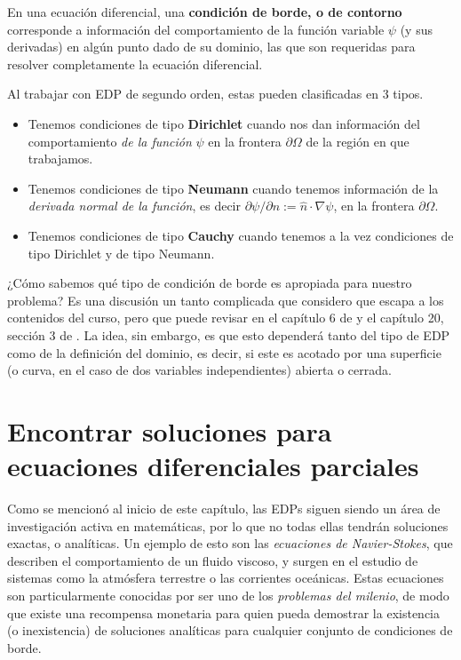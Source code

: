 \begin{defi} 
    En una ecuación diferencial, una \textbf{condición de borde, o de contorno} corresponde a información del comportamiento de la función variable $\psi$ (y sus derivadas) en algún punto dado de su dominio, las que son requeridas para resolver completamente la ecuación diferencial.

    Al trabajar con EDP de segundo orden, estas pueden clasificadas en 3 tipos.
    \begin{itemize}
        \item Tenemos condiciones de tipo \textbf{Dirichlet} cuando nos dan información del comportamiento \emph{de la función} $\psi$ en la frontera $\partial \Omega$ de la región en que trabajamos.
        \item Tenemos condiciones de tipo \textbf{Neumann} cuando tenemos información de la \emph{derivada normal de la función}, es decir $\partial \psi/\partial n := \hat{n} \cdot \nabla \psi$, en la frontera $\partial \Omega$.
        \item Tenemos condiciones de tipo \textbf{Cauchy} cuando tenemos a la vez condiciones de tipo Dirichlet y de tipo Neumann.
    \end{itemize} 
\end{defi}



¿Cómo sabemos qué tipo de condición de borde es apropiada para nuestro problema? Es una discusión un tanto complicada que considero que escapa a los contenidos del curso, pero que puede revisar en el capítulo 6 de \cite{Morse_Feshbach_1999} y el capítulo 20, sección 3 de \cite{Riley}. La idea, sin embargo, es que esto dependerá tanto del tipo de EDP como de la definición del dominio, es decir, si este es acotado por una superficie (o curva, en el caso de dos variables independientes) abierta o cerrada.

\section{Encontrar soluciones para ecuaciones diferenciales parciales}

Como se mencionó al inicio de este capítulo, las EDPs siguen siendo un área de investigación activa en matemáticas, por lo que no todas ellas tendrán soluciones exactas, o analíticas. Un ejemplo de esto son las \emph{ecuaciones de Navier-Stokes}, que describen el comportamiento de un fluido viscoso, y surgen en el estudio de sistemas como la atmósfera terrestre o las corrientes oceánicas. Estas ecuaciones son particularmente conocidas por ser uno de los \emph{problemas del milenio}, de modo que existe una recompensa monetaria para quien pueda demostrar la existencia (o inexistencia) de soluciones analíticas para cualquier conjunto de condiciones de borde.

